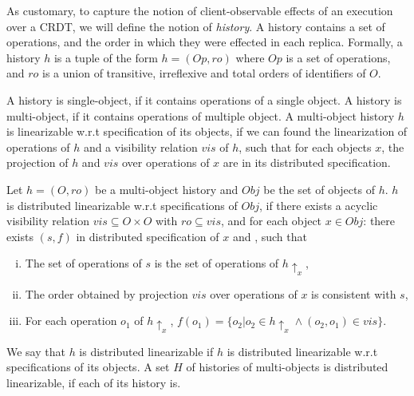  As customary, to capture the notion of client-observable effects of an execution over a CRDT, we will define the notion of \emph{history}. A history contains a set of operations, and the order in which they were effected in each replica. Formally, a history $h$ is a tuple of the form $h = (Op,\mathit{ro})$ where $Op$ is a set of operations, and $\mathit{ro}$ is a union of transitive, irreflexive and total orders of identifiers of $O$.


A history is single-object, if it contains operations of a single object. A history is multi-object, if it contains operations of multiple object. A multi-object history $h$ is linearizable w.r.t specification of its objects, if we can found the linearization of operations of $h$ and a visibility relation $\mathit{vis}$ of $h$, such that for each objects $x$, the projection of $h$ and $\mathit{vis}$ over operations of $x$ are in its distributed specification.


\begin{definition}
\label{definition:distributed linearizability}

Let $h = (O,\mathit{ro})$ be a multi-object history and $\mathit{Obj}$ be the set of objects of $h$. $h$ is distributed linearizable w.r.t specifications of $\mathit{Obj}$, if there exists a acyclic visibility relation $\mathit{vis} \subseteq O \times O$ with $\mathit{ro} \subseteq \mathit{vis}$, and for each object $x \in \mathit{Obj}$: there exists $(s,f)$ in distributed specification of $x$ and , such that

\begin{enumerate}[(i)]
\item The set of operations of $s$ is the set of operations of $h \uparrow_{x}$,
\item The order obtained by projection $\mathit{vis}$ over operations of $x$ is consistent with $s$,
\item For each operation $o_1$ of $h \uparrow_{x}$, $f(o_1) = \{ o_2 \vert o_2 \in h \uparrow_{x} \wedge (o_2,o_1) \in \mathit{vis} \}$.
\end{enumerate}

We say that $h$ is distributed linearizable if $h$ is distributed linearizable w.r.t specifications of its objects. A set $H$ of histories of multi-objects is distributed linearizable, if each of its history is.
\end{definition}


